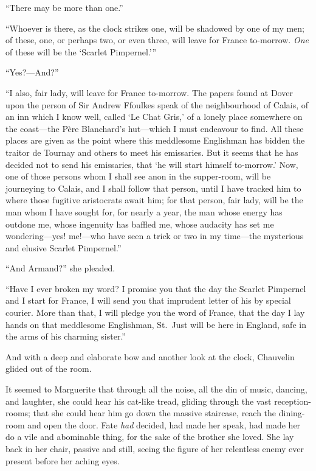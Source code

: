 \documentclass[paper=5.5in:8.5in,BCOR=7mm,twoside,DIV=calc,12pt,usegeometry,chapterprefix,endperiod,headings=big]{scrbook}
\begin{document}
\enquote{There may be more than one.}

\enquote{Whoever is there, as the clock strikes one, will be shadowed by one of my men; of these, one, or perhaps two, or even three, will leave for France to-morrow. \textit{One} of these will be the \enquote{Scarlet Pimpernel.}}

\enquote{Yes?---And?}

\enquote{I also, fair lady, will leave for France to-morrow. The papers found at Dover upon the person of Sir Andrew Ffoulkes speak of the neighbourhood of Calais, of an inn which I know well, called \enquote{Le Chat Gris,} of a lonely place somewhere on the coast---the Père Blanchard's hut---which I must endeavour to find. All these places are given as the point where this meddlesome Englishman has bidden the traitor de Tournay and others to meet his emissaries. But it seems that he has decided not to send his emissaries, that \enquote{he will start himself to-morrow.} Now, one of those persons whom I shall see anon in the supper-room, will be journeying to Calais, and I shall follow that person, until I have tracked him to where those fugitive aristocrats await him; for that person, fair lady, will be the man whom I have sought for, for nearly a year, the man whose energy has outdone me, whose ingenuity has baffled me, whose audacity has set me wondering---yes! me!---who have seen a trick or two in my time---the mysterious and elusive Scarlet Pimpernel.}

\enquote{And Armand?} she pleaded.

\enquote{Have I ever broken my word? I promise you that the day the Scarlet Pimpernel and I start for France, I will send you that imprudent letter of his by special courier. More than that, I will pledge you the word of France, that the day I lay hands on that meddlesome Englishman, St.~Just will be here in England, safe in the arms of his charming sister.}

And with a deep and elaborate bow and another look at the clock, Chauvelin glided out of the room.

It seemed to Marguerite that through all the noise, all the din of music, dancing, and laughter, she could hear his cat-like tread, gliding through the vast reception-rooms; that she could hear him go down the massive staircase, reach the dining-room and open the door. Fate \textit{had} decided, had made her speak, had made her do a vile and abominable thing, for the sake of the brother she loved. She lay back in her chair, passive and still, seeing the figure of her relentless enemy ever present before her aching eyes.
\end{document}
